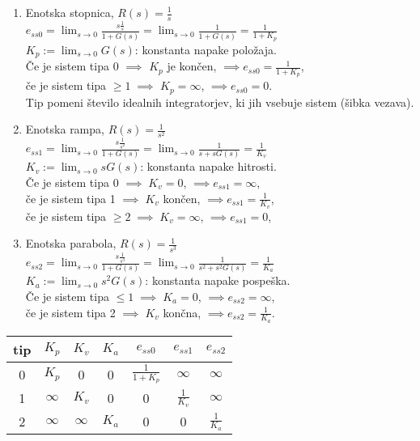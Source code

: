 \documentclass[a4paper, 12pt]{book}
\theoremstyle{definition}
\theoremstyle{remark}
\begin{document}
\begin{enumerate}[label=\alph*)]
    \item Enotska stopnica, $R(s) = \frac{1}{s}$ \\
        $e_{ss0} = \lim_{s \to 0} \frac{s \frac{1}{s}}{1+G(s)} =
        \lim_{s \to 0} \frac{1}{1+G(s)} = \frac{1}{1+K_p}$ \\
        $K_p := \lim_{s \to 0} G(s)$: konstanta napake položaja. \\
        Če je sistem tipa 0 $\implies$ $K_p$ je končen, $\implies e_{ss0} = \frac{1}{1+K_p}$, \\
        če je sistem tipa $\geq 1 \; \implies$ $K_p = \infty$, $\implies e_{ss0} = 0$. \\
        Tip pomeni število idealnih integratorjev, ki jih vsebuje sistem (šibka vezava).
    \item Enotska rampa, $R(s) = \frac{1}{s^2}$ \\
        $e_{ss1} = \lim_{s \to 0} \frac{s \frac{1}{s^2}}{1+G(s)} =
        \lim_{s \to 0} \frac{1}{s+sG(s)} = \frac{1}{K_v}$ \\
        $K_v := \lim_{s \to 0} s G(s)$: konstanta napake hitrosti. \\
        Če je sistem tipa 0 $\implies \; K_v = 0$, $\implies e_{ss1} = \infty$, \\
        če je sistem tipa 1 $\implies \; K_v$ končen, $\implies e_{ss1} = \frac{1}{K_v}$, \\
        če je sistem tipa $\geq 2 \; \implies \; K_v = \infty$, $\implies e_{ss1} = 0$, \\
    \item Enotska parabola, $R(s) = \frac{1}{s^3}$ \\
        $e_{ss2} = \lim_{s \to 0} \frac{s \frac{1}{s^3}}{1+G(s)} =
        \lim_{s \to 0} \frac{1}{s^2+s^2 G(s)} = \frac{1}{K_a}$ \\
        $K_a := \lim_{s \to 0} s^2 G(s)$: konstanta napake pospeška. \\
        Če je sistem tipa $\leq 1 \; \implies \; K_a = 0$, $\implies e_{ss2} = \infty$, \\
        če je sistem tipa 2 $\implies \; K_v$ končna, $\implies e_{ss2} = \frac{1}{K_a}$.
\end{enumerate}
\begin{center}
    \begin{tabular}{c | c c c |c c c}
        tip & $K_p$ & $K_v$ & $K_a$ & $e_{ss0}$ & $e_{ss1}$ & $e_{ss2}$ \\
        \hline
        0 & $K_p$ & 0 & 0 & $\frac{1}{1+K_p}$ & $\infty$ & $\infty$ \\
        1 & $\infty$ & $K_v$ & 0 & 0 & $\frac{1}{K_v}$ & $\infty$ \\
        2 & $\infty$ & $\infty$ & $K_a$ & 0 & 0 & $\frac{1}{K_a}$ \\
    \end{tabular}
\end{center}
\end{document}
